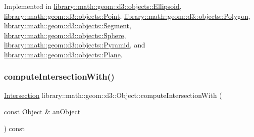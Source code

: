 Implemented in \hyperlink{classlibrary_1_1math_1_1geom_1_1d3_1_1objects_1_1_ellipsoid_a8982455e000708f1b7e4caf728e7ad40}{library\+::math\+::geom\+::d3\+::objects\+::\+Ellipsoid}, \hyperlink{classlibrary_1_1math_1_1geom_1_1d3_1_1objects_1_1_point_a32aa1e233c6ac5341605961f6bf0f210}{library\+::math\+::geom\+::d3\+::objects\+::\+Point}, \hyperlink{classlibrary_1_1math_1_1geom_1_1d3_1_1objects_1_1_polygon_a2dad7a1309d367e388fdf6a8141557da}{library\+::math\+::geom\+::d3\+::objects\+::\+Polygon}, \hyperlink{classlibrary_1_1math_1_1geom_1_1d3_1_1objects_1_1_segment_a589ad56339616f362cee84a2ecab61a4}{library\+::math\+::geom\+::d3\+::objects\+::\+Segment}, \hyperlink{classlibrary_1_1math_1_1geom_1_1d3_1_1objects_1_1_sphere_a58370a8ff15b7c5a48cf4ffec5be3015}{library\+::math\+::geom\+::d3\+::objects\+::\+Sphere}, \hyperlink{classlibrary_1_1math_1_1geom_1_1d3_1_1objects_1_1_pyramid_a7d58c19912afc64421c74d8272cf2271}{library\+::math\+::geom\+::d3\+::objects\+::\+Pyramid}, and \hyperlink{classlibrary_1_1math_1_1geom_1_1d3_1_1objects_1_1_plane_a7ceb970c35968551600e2380795a0a4c}{library\+::math\+::geom\+::d3\+::objects\+::\+Plane}.

\mbox{\label{classlibrary_1_1math_1_1geom_1_1d3_1_1_object_ad0e609afe46a20412d8dbff6e0214203}} 
\subsubsection{\texorpdfstring{compute\+Intersection\+With()}{computeIntersectionWith()}}
{\footnotesize\ttfamily \hyperlink{classlibrary_1_1math_1_1geom_1_1d3_1_1_intersection}{Intersection} library\+::math\+::geom\+::d3\+::\+Object\+::compute\+Intersection\+With (\begin{DoxyParamCaption}\item[{const \hyperlink{classlibrary_1_1math_1_1geom_1_1d3_1_1_object}{Object} \&}]{an\+Object }\end{DoxyParamCaption}) const\hspace{0.3cm}{\ttfamily [virtual]}}

\mbox{\label{classlibrary_1_1math_1_1geom_1_1d3_1_1_object_abaf45bf02ca165ba7bf685b24f5f97ef}} 
